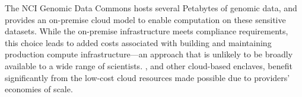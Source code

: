 The NCI Genomic Data Commons \cite{grossman2016toward} hosts several Petabytes of
genomic data, and provides an on-premise cloud model to enable computation on these sensitive datasets.
While the on-premise infrastructure meets compliance requirements, this choice leads to added costs associated with
building and maintaining production compute infrastructure---an approach that is unlikely to be 
broadly available to a wide range of scientists. \NAME, and other cloud-based enclaves, benefit
significantly from the low-cost cloud resources made possible due to providers' economies of scale.




